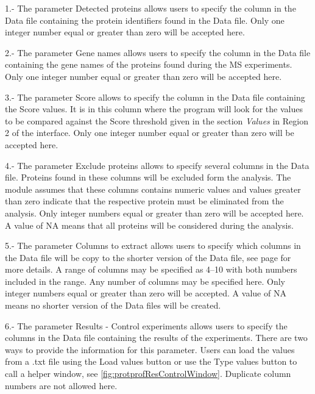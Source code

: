 \num{1}.- The parameter Detected proteins allows users to specify the column in the Data file containing the protein identifiers found in the Data file. Only one integer number equal or greater than zero will be accepted here. 

\num{2}.- The parameter Gene names allows users to specify the column in the Data file containing the gene names of the proteins found during the MS experiments. Only one integer number equal or greater than zero will be accepted here. 

\num{3}.- The parameter Score allows to specify the column in the Data file containing the Score values.  It is in this column where the program will look for the values to be compared against the Score threshold given in the section \textit{Values} in Region \num{2} of the interface. Only one integer number equal or greater than zero will be accepted here. 

\num{4}.- The parameter Exclude proteins allows to specify several columns in the Data file. Proteins found in these columns will be excluded form the analysis. The module assumes that these columns contains numeric values and values greater than zero indicate that the respective protein must be eliminated from the analysis. Only integer numbers equal or greater than zero will be accepted here. A value of NA means that all proteins will be considered during the analysis. 

\num{5}.- The parameter Columns to extract\label{par:protprofColumnExtract} allows users to specify which columns in the Data file will be copy to the shorter version of the Data file, see page \pageref{subsec:utilShortDF} for more details. A range of columns may be specified as \numrange[range-phrase = --]{4}{10} with both numbers included in the range. Any number of columns may be specified here. Only integer numbers equal or greater than zero will be accepted. A value of NA means no shorter version of the Data files will be created.

\num{6}.-  \label{par:protprofResultControl}The parameter Results - Control experiments allows users to specify the columns in the Data file containing the results of the experiments. There are two ways to provide the information for this parameter. Users can load the values from a .txt file using the Load values button or use the Type values button to call a helper window, see \autoref{fig:protprofResControlWindow}. Duplicate column numbers are not allowed here.

